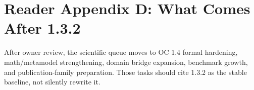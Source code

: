 \documentclass[11pt,a4paper]{article}
\begin{document}
\clearpage
\section*{Reader Appendix D: What Comes After 1.3.2}
After owner review, the scientific queue moves to OC 1.4 formal hardening, math/metamodel strengthening, domain bridge expansion, benchmark growth, and publication-family preparation. Those tasks should cite 1.3.2 as the stable baseline, not silently rewrite it.
\end{document}
